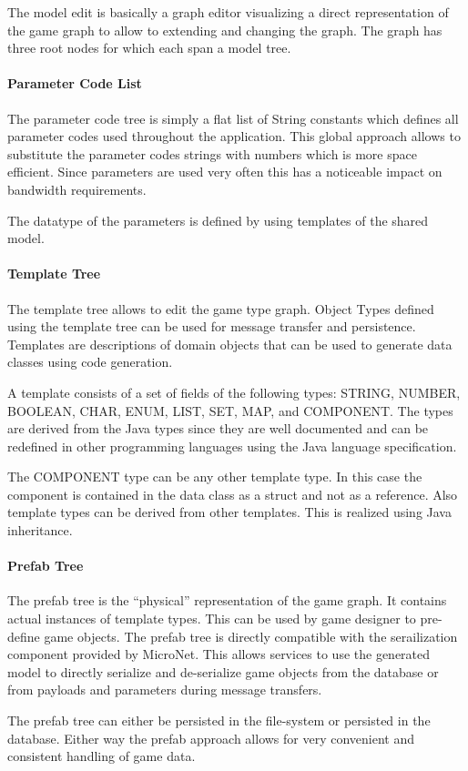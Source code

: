The model edit is basically a graph editor visualizing a direct representation
of the game graph to allow to extending and changing the graph. The graph has
three root nodes for which each span a model tree.

\paragraph{Parameter Code List}

The parameter code tree is simply a flat list of String constants which defines
all parameter codes used throughout the application. This global approach allows
to substitute the parameter codes strings with numbers which is more space
efficient. Since parameters are used very often this has a noticeable impact on
bandwidth requirements.

The datatype of the parameters is defined by using templates of the shared
model.

\paragraph{Template Tree}

The template tree allows to edit the game type graph. Object Types defined using
the template tree can be used for message transfer and persistence. Templates
are descriptions of domain objects that can be used to generate data classes
using code generation.

A template consists of a set of fields of the following types: STRING, NUMBER,
BOOLEAN, CHAR, ENUM, LIST, SET, MAP, and COMPONENT. The types are derived from
the Java types since they are well documented and can be redefined in other
programming languages using the Java language specification.

The COMPONENT type can be any other template type. In this case the component is
contained in the data class as a struct and not as a reference. Also template
types can be derived from other templates. This is realized using Java
inheritance.

\paragraph{Prefab Tree}

The prefab tree is the ``physical'' representation of the game graph. It
contains actual instances of template types. This can be used by game designer
to pre-define game objects. The prefab tree is directly compatible with the
serailization component provided by MicroNet. This allows services to use the
generated model to directly serialize and de-serialize game objects from the
database or from payloads and parameters during message transfers.

The prefab tree can either be persisted in the file-system or persisted in the
database. Either way the prefab approach allows for very convenient and
consistent handling of game data.

